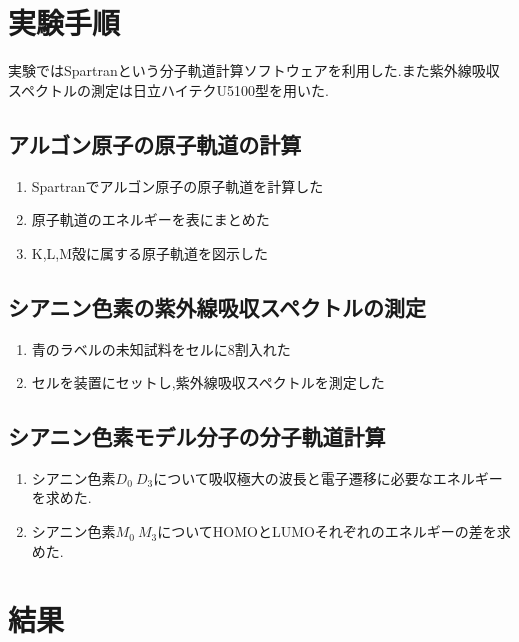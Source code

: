 \documentclass[a4j,10pt,dvipdfmx]{jarticle}
\begin{document}
  \section{実験手順}
  実験ではSpartranという分子軌道計算ソフトウェアを利用した.また紫外線吸収スペクトルの測定は日立ハイテクU5100型を用いた.
  \subsection{アルゴン原子の原子軌道の計算}
  \begin{enumerate}
    \item Spartranでアルゴン原子の原子軌道を計算した
    \item 原子軌道のエネルギーを表にまとめた
    \item K,L,M殻に属する原子軌道を図示した
  \end{enumerate}
  \subsection{シアニン色素の紫外線吸収スペクトルの測定}
  \begin{enumerate}
    \item 青のラベルの未知試料をセルに8割入れた
    \item セルを装置にセットし,紫外線吸収スペクトルを測定した
  \end{enumerate}
  \subsection{シアニン色素モデル分子の分子軌道計算}
  \begin{enumerate}
    \item シアニン色素$D_0~D_3$について吸収極大の波長と電子遷移に必要なエネルギーを求めた.
    \item シアニン色素$M_0~M_3$についてHOMOとLUMOそれぞれのエネルギーの差を求めた.
  \end{enumerate}
  \section{結果}
\end{document}
